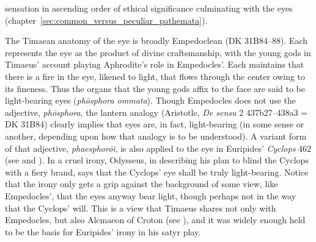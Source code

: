 sensation in ascending order of ethical significance culminating with the eyes (chapter~\ref{sec:common_versus_peculiar_pathemata}).

The Timaean anatomy of the eye is broadly Empedoclean (DK 31B84--88). Each represents the eye as the product of divine craftsmanship, with the young gods in Timaeus' account playing Aphrodite's role in Empedocles'. Each maintains that there is a fire in the eye, likened to light, that flows through the center owing to its fineness. Thus the organs that the young gods affix to the face are said to be light-bearing eyes (\emph{phōsphora ommata}). Though Empedocles does not use the adjective, \emph{phōsphora}, the lantern analogy (Aristotle, \emph{De sensu} 2 437b27–438a3 = DK 31B84) clearly implies that eyes are, in fact, light-bearing (in some sense or another, depending upon how that analogy is to be understood). A variant form of that adjective, \emph{phaesphorōi}, is also applied to the eye in Euripides' \emph{Cyclops} 462 (see \citealt[489-90]{Seaford:1984vb} and \citealt[114]{Johansen:2004dx}). In a cruel irony, Odysseus, in describing his plan to blind the Cyclops with a fiery brand, says that the Cyclops' eye shall be truly light-bearing. Notice that the irony only gets a grip against the background of some view, like Empedocles', that the eyes anyway bear light, though perhaps not in the way that the Cyclops' will. This is a view that Timaeus shares not only with Empedocles, but also Alcmaeon of Croton (see \citealt[11--13]{Beare:1906uq}), and it was widely enough held to be the basis for Euripides' irony in his satyr play.

